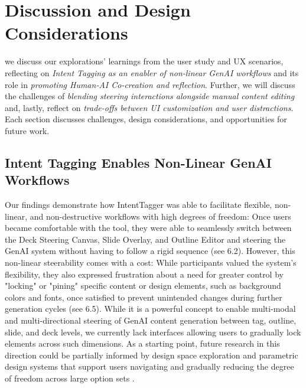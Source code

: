 \section{Discussion and Design Considerations}


 we discuss our explorations' learnings from the user study and UX scenarios, reflecting on \textit{Intent Tagging as an enabler of non-linear GenAI workflows} and its role in \textit{promoting Human-AI Co-creation and reflection}. Further, we will discuss the challenges of \textit{blending steering interactions alongside manual content editing} and, lastly, reflect on \textit{trade-offs between UI customization and user distractions}. 
Each section discusses challenges, design considerations, and opportunities for future work. 


\subsection{Intent Tagging Enables Non-Linear GenAI Workflows}

Our findings demonstrate how IntentTagger was able to facilitate flexible, non-linear, and non-destructive workflows with high degrees of freedom: Once users became comfortable with the tool, they were able to seamlessly switch between the Deck Steering Canvas, Slide Overlay, and Outline Editor and steering the GenAI system without having to follow a rigid sequence (see 6.2). 
However, this non-linear steerability comes with a cost: While participants valued the system’s flexibility, they also expressed frustration about a need for greater control by "locking" or "pining" specific content or design elements, such as background colors and fonts, once satisfied to prevent unintended changes during further generation cycles (see 6.5).
While it is a powerful concept to enable multi-modal and multi-directional steering of GenAI content generation between tag, outline, slide, and deck levels, we currently lack interfaces allowing users to gradually lock elements across such dimensions. 
As a starting point, future research in this direction could be partially informed by design space exploration and parametric design systems that support users navigating and gradually reducing the degree of freedom across large option sets \cite{zaman_gemni_2015, matejka_dream_2018}.




